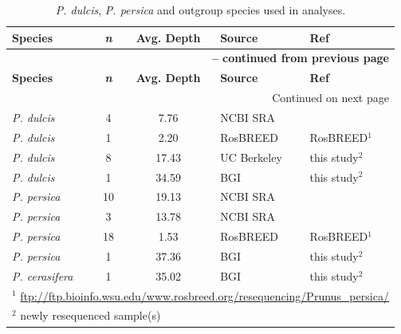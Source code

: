 \documentclass[12pt]{article}
\begin{document}
\begin{center}
\begin{longtable}{lccll}
\caption{\emph{P. dulcis}, \emph{P. persica} and outgroup species used in analyses.} \label{samples} \\
\hline \hline 
\multicolumn{1}{l}{\textbf{Species}} &
\multicolumn{1}{c}{\textbf{\emph{n}}} &
\multicolumn{1}{c}{\textbf{Avg. Depth}} &
\multicolumn{1}{l}{\textbf{Source}} &
\multicolumn{1}{l}{\textbf{Ref}}\\
\hline 
\endfirsthead

\multicolumn{5}{r}{{\bfseries \tablename\ \thetable{} -- continued from previous page}} \\
\hline
\multicolumn{1}{l}{\textbf{Species}} &
\multicolumn{1}{c}{\textbf{\emph{n}}} &
\multicolumn{1}{c}{\textbf{Avg. Depth}} &
\multicolumn{1}{l}{\textbf{Source}} &
\multicolumn{1}{l}{\textbf{Ref}} \\
\hline 
\endhead
%
\hline
\multicolumn{5}{r}{{Continued on next page}} \\
\hline \hline
\endfoot
%
\endlastfoot
%
	\emph{P. dulcis} &4 &7.76 &NCBI SRA &\citealp{koepke2013comparative}\\
	\emph{P. dulcis} &1 &2.20 &RosBREED &RosBREED$^{1}$\\
	\emph{P. dulcis} &8 &17.43 &UC Berkeley &this study$^{2}$\\
	\emph{P. dulcis} &1 &34.59 &BGI &this study$^{2}$\\
	\emph{P. persica} &10 &19.13 &NCBI SRA &\citealp{verde2013high} \\
	\emph{P. persica} &3 &13.78 &NCBI SRA &\citealp{ahmad2011whole} \\
	\emph{P. persica} &18 &1.53 &RosBREED &RosBREED$^{1}$ \\
	\emph{P. persica} &1 &37.36 &BGI &this study$^{2}$\\
	\emph{P. cerasifera} &1 &35.02 &BGI &this study$^{2}$\\ \hline \hline
	\multicolumn{5}{l}{$^{1}$ \url{ftp://ftp.bioinfo.wsu.edu/www.rosbreed.org/resequencing/Prunus_persica/}}\\
	\multicolumn{5}{l}{$^{2}$ newly resequenced sample(s)}
\end{longtable}
\end{center}
%
%
\end{document}
